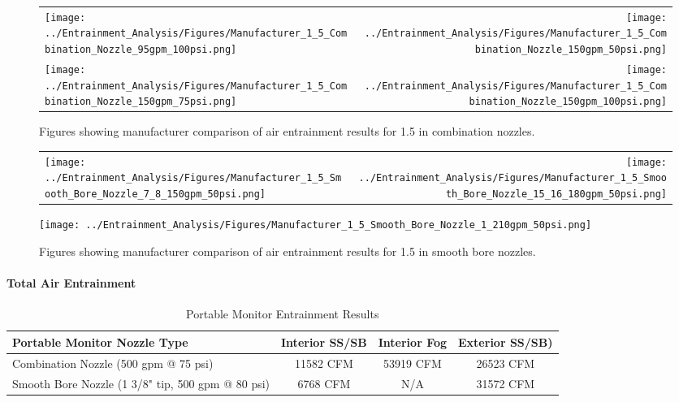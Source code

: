 \documentclass{article}
\begin{document}
\clearpage

\begin{figure}[!ht]
\begin{tabular*}{\textwidth}{lr}
\texttt{[image: ../Entrainment\_Analysis/Figures/Manufacturer\_1\_5\_Combination\_Nozzle\_95gpm\_100psi.png]} &
\texttt{[image: ../Entrainment\_Analysis/Figures/Manufacturer\_1\_5\_Combination\_Nozzle\_150gpm\_50psi.png]} \\
\texttt{[image: ../Entrainment\_Analysis/Figures/Manufacturer\_1\_5\_Combination\_Nozzle\_150gpm\_75psi.png]} &
\texttt{[image: ../Entrainment\_Analysis/Figures/Manufacturer\_1\_5\_Combination\_Nozzle\_150gpm\_100psi.png]} \\
\end{tabular*}
\caption{Figures showing manufacturer comparison of air entrainment results for 1.5 in combination nozzles.}
\label{fig:1_5_Interior_Combination_Manufacturer}
\end{figure}

\clearpage

\begin{figure}[!ht]
\begin{tabular*}{\textwidth}{lr}
\texttt{[image: ../Entrainment\_Analysis/Figures/Manufacturer\_1\_5\_Smooth\_Bore\_Nozzle\_7\_8\_150gpm\_50psi.png]} &
\texttt{[image: ../Entrainment\_Analysis/Figures/Manufacturer\_1\_5\_Smooth\_Bore\_Nozzle\_15\_16\_180gpm\_50psi.png]} \\
\end{tabular*}
\centering
\texttt{[image: ../Entrainment\_Analysis/Figures/Manufacturer\_1\_5\_Smooth\_Bore\_Nozzle\_1\_210gpm\_50psi.png]} 
\caption{Figures showing manufacturer comparison of air entrainment results for 1.5 in smooth bore nozzles.}
\label{fig:1_5_Interior_Smooth_Bore_Manufacturer}
\end{figure}

\clearpage

\paragraph{Total Air Entrainment}

\vspace*{\baselineskip}

\begin{table}[!ht]
\centering
\begin{tabular}{|l|ccc|}
\hline
\textbf{Portable Monitor Nozzle Type} & \multicolumn{1}{c|}{\textbf{Interior SS/SB}} & \multicolumn{1}{c|}{\textbf{Interior Fog}} & \textbf{Exterior SS/SB)} \\ \hline
Combination Nozzle (500 gpm @ 75 psi) & 11582 CFM & 53919 CFM & 26523 CFM \\
Smooth Bore Nozzle (1 3/8" tip, 500 gpm @ 80 psi) & 6768 CFM & N/A & 31572 CFM \\ \hline
\end{tabular}
\caption{Portable Monitor Entrainment Results}
\label{Portable_Monitor_Entrainment_Results}
\end{table}
\end{document}
